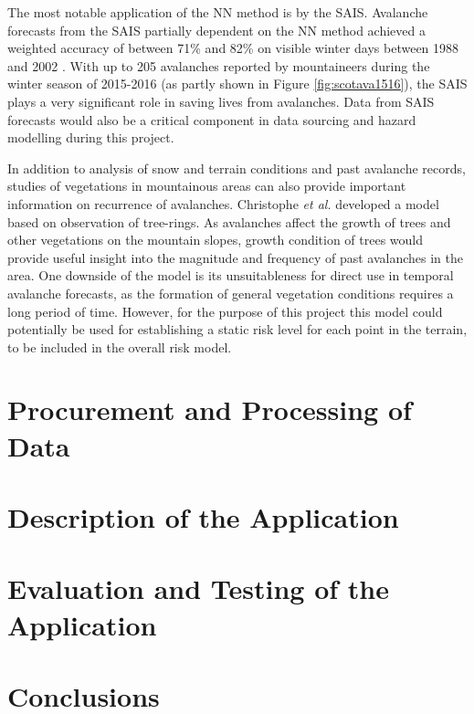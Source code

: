 \documentclass[openany]{UoYCSproject}
\begin{document}
The most notable application of the NN method is by the SAIS. Avalanche forecasts from the SAIS partially dependent on the NN method achieved a weighted accuracy of between 71\% and 82\% on visible winter days between 1988 and 2002 \cite[p. 351] {Purves2003343}. With up to 205 avalanches reported by mountaineers during the winter season of 2015-2016 \cite{sais} (as partly shown in Figure \ref{fig:scotava1516}), the SAIS plays a very significant role in saving lives from avalanches. Data from SAIS forecasts would also be a critical component in data sourcing and hazard modelling during this project.

In addition to analysis of snow and terrain conditions and past avalanche records, studies of vegetations in mountainous areas can also provide important information on recurrence of avalanches. Christophe \textit{et al.} \cite{Christophe2010107} developed a model based on observation of tree-rings. As avalanches affect the growth of trees and other vegetations on the mountain slopes, growth condition of trees would provide useful insight into the magnitude and frequency of past avalanches in the area. One downside of the model is its unsuitableness for direct use in temporal avalanche forecasts, as the formation of general vegetation conditions requires a long period of time. However, for the purpose of this project this model could potentially be used for establishing a static risk level for each point in the terrain, to be included in the overall risk model.
 
\chapter{Procurement and Processing of Data} \label{ch:data}

\chapter{Description of the Application} \label{ch:app-description}

\chapter{Evaluation and Testing of the Application} \label{ch:app-testing}

\chapter{Conclusions} \label{ch:conclusions}

\small{}
\end{document}
